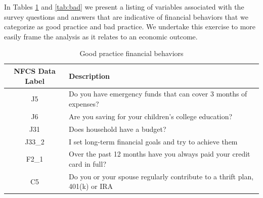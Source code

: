 \documentclass[12pt]{article}
\renewcommand{\arraystretch}{0.7}
\theoremstyle{plain}
\begin{document}
In Tables \ref{tab:good}  and \ref{tab:bad} we present a listing of variables associated with the survey questions and answers that are indicative of financial behaviors that we categorize as good practice and bad practice. We undertake this exercise to more easily frame the analysis as it relates to  an economic outcome.

\begin{table}[H]
\centering
\caption{Good practice financial behaviors}
\renewcommand{\arraystretch}{1}
\begin{tabular}{|c|p{13.3cm}|} 
 \hline 
\textbf{NFCS Data Label} & \textbf{Description}\\ [0.5ex] 
 \hline \hline
 
J5 & Do you have emergency funds that can cover 3 months of expenses?\\
 \hline
J6 &	Are you saving for your children's college education?\\
\hline
J31 &	Does household have a budget?\\
\hline
J33\_2 &	I set long-term financial goals and try to achieve them\\
\hline
F2\_1 &	Over the past 12 months have you always paid your credit card in full?\\
\hline
C5 &	Do you or your spouse regularly contribute to a thrift plan, 401(k) or IRA\\
\hline
\end{tabular}
\label{tab:good}
\end{table}
\end{document}
